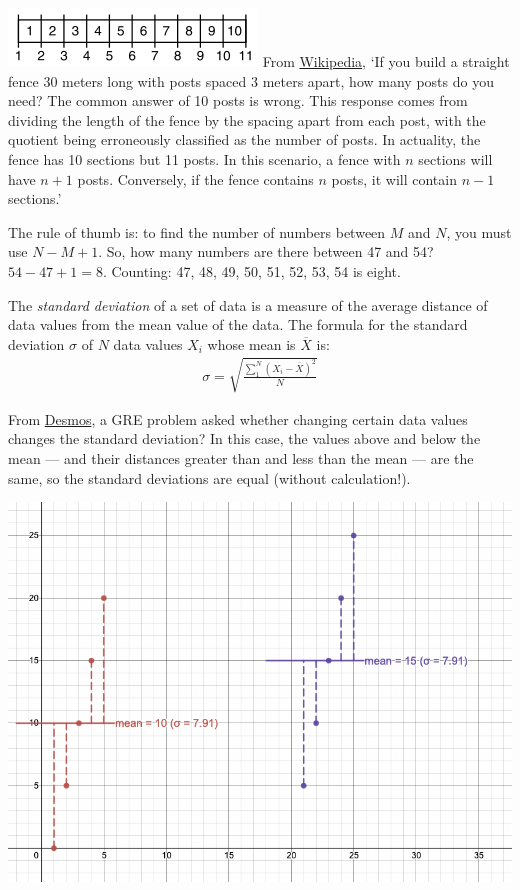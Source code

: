 \documentclass[11pt]{article}%
\begin{document}
\begin{multicols*}{2}
\divider%

\includegraphics{./250px-Fencepost_error.svg.png}
From \href{https://en.wikipedia.org/wiki/Off-by-one_error\#Fencepost_error}{Wikipedia}, `If you build a straight fence 30 meters long with posts spaced 3 meters apart, how many posts do you need? The common answer of 10 posts is wrong. This response comes from dividing the length of the fence by the spacing apart from each post, with the quotient being erroneously classified as the number of posts. In actuality, the fence has 10 sections but 11 posts. In this scenario, a fence with $n$ sections will have $n + 1$ posts. Conversely, if the fence contains $n$ posts, it will contain $n - 1$ sections.'

The rule of thumb is: to find the number of numbers between $M$ and $N$, you must use $N - M + 1$. So, how many numbers are there between 47 and 54? $54 - 47 + 1 = 8$. Counting: 47, 48, 49, 50, 51, 52, 53, 54 is eight.

\divider

The \textit{standard deviation} of a set of data is a measure of the average distance of data values from the mean value of the data. The formula for the standard deviation $\sigma$ of $N$ data values $X_{i}$ whose mean is $\overline{X}$ is:
\begin{align*}
\sigma = \sqrt{\frac{\sum_{1}^{N}\left(X_{i} - \overline{X}\right)^{2}}{N}}
\end{align*}

From \href{https://www.desmos.com/calculator/dyjchcbu3s}{Desmos}, a GRE problem asked whether changing certain data values changes the standard deviation? In this case, the values above and below the mean --- and their distances greater than and less than the mean --- are the same, so the standard deviations are equal (without calculation!).

\includegraphics[width=\columnwidth]{./desmos-std-dev.png}


\end{multicols*}
\end{document}
